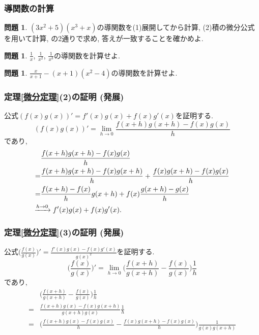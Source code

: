 \documentclass[dvipdfmx,cjk,10.2pt]{beamer}
\theoremstyle{definition}
\newtheorem{Prob}[Thm]{問題}
\begin{document}
\begin{frame}
\frametitle{導関数の計算}


\begin{Prob}
$(3x^2+5)(x^3+x)$の導関数を(1)展開してから計算, (2)積の微分公式を用いて計算, の2通りで求め, 答えが一致することを確かめよ. 
\end{Prob}


\begin{Prob}
$\frac{1}{x}$, $\frac{1}{x^2}$, $\frac{1}{x^3}$の導関数を計算せよ. 
\end{Prob}

\begin{Prob}
$\frac{x}{x+1}-(x+1)(x^2-4)$の導関数を計算せよ. 
\end{Prob}


\end{frame}




\begin{frame}
\frametitle{定理\ref{微分定理}(2)の証明 (発展)}

公式$(f(x)g(x))'=f'(x)g(x)+f(x)g'(x)$を証明する. 
$$
(f(x)g(x))' = \lim_{h \to 0} \frac{f(x+h)g(x+h)-f(x)g(x)}{h}
$$
であり, 
\begin{align*}
& \frac{f(x+h)g(x+h)-f(x)g(x)}{h} \\
=& 
\frac{f(x+h)g(x+h)-f(x)g(x+h)}{h}
+
\frac{f(x)g(x+h)-f(x)g(x)}{h} \\
=& 
\frac{f(x+h)-f(x)}{h}g(x+h)
+
f(x)\frac{g(x+h)-g(x)}{h} \\
& \hspace{-4mm} \xrightarrow{h \to 0} 
f'(x)g(x)+f(x)g'(x). 
\end{align*}

\end{frame}





\begin{frame}
\frametitle{定理\ref{微分定理}(3)の証明 (発展)}

公式$\Big(\frac{f(x)}{g(x)}\Big)'=\frac{f'(x)g(x)-f(x)g'(x)}{g(x)^2}$を証明する. 
$$
\Big(\frac{f(x)}{g(x)}\Big)'= \lim_{h \to 0} \Big(\frac{f(x+h)}{g(x+h)} - \frac{f(x)}{g(x)}\Big) \frac{1}{h}
$$
であり, 
\begin{align*}
&\Big(\frac{f(x+h)}{g(x+h)} - \frac{f(x)}{g(x)}\Big) \frac{1}{h} \\
=& 
\frac{f(x+h)g(x)-f(x)g(x+h)}{g(x+h)g(x)} \frac{1}{h} \\
=& 
\Big(
\frac{f(x+h)g(x)-f(x)g(x)}{h}- \frac{f(x)g(x+h)-f(x)g(x)}{h}
\Big) \frac{1}{g(x)g(x+h)}
\end{align*}

\end{frame}
\end{document}

